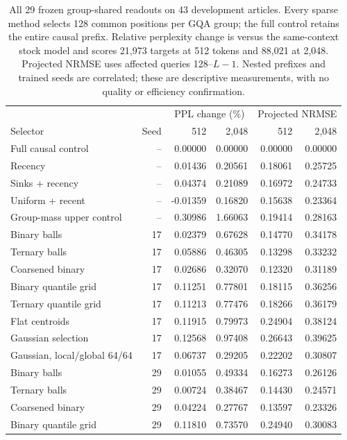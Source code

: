 \documentclass[11pt]{article}
\begin{document}
\begin{table}[tbp]
\centering\small
\setlength{\tabcolsep}{4pt}
\caption{All 29 frozen group-shared readouts on 43 development articles.
Every sparse method selects 128 common positions per GQA group; the full
control retains the entire causal prefix. Relative perplexity change is
versus the same-context stock model and scores 21,973 targets at 512 tokens
and 88,021 at 2,048. Projected NRMSE uses affected queries 128--\(L-1\).
Nested prefixes and trained seeds are correlated; these are descriptive
measurements, with no quality or efficiency confirmation.}
\begin{tabular}{lrrrrr}
\toprule
& & \multicolumn{2}{c}{PPL change (\%)} & \multicolumn{2}{c}{Projected NRMSE}\\
Selector & Seed & 512 & 2,048 & 512 & 2,048\\
\midrule
Full causal control & -- & 0.00000 & 0.00000 & 0.00000 & 0.00000\\
Recency & -- & 0.01436 & 0.20561 & 0.18061 & 0.25725\\
Sinks + recency & -- & 0.04374 & 0.21089 & 0.16972 & 0.24733\\
Uniform + recent & -- & -0.01359 & 0.16820 & 0.15638 & 0.23364\\
Group-mass upper control & -- & 0.30986 & 1.66063 & 0.19414 & 0.28163\\
\midrule
Binary balls & 17 & 0.02379 & 0.67628 & 0.14770 & 0.34178\\
Ternary balls & 17 & 0.05886 & 0.46305 & 0.13298 & 0.33232\\
Coarsened binary & 17 & 0.02686 & 0.32070 & 0.12320 & 0.31189\\
Binary quantile grid & 17 & 0.11251 & 0.77801 & 0.18115 & 0.36256\\
Ternary quantile grid & 17 & 0.11213 & 0.77476 & 0.18266 & 0.36179\\
Flat centroids & 17 & 0.11915 & 0.79973 & 0.24904 & 0.38124\\
Gaussian selection & 17 & 0.12568 & 0.97408 & 0.26643 & 0.39625\\
Gaussian, local/global 64/64 & 17 & 0.06737 & 0.29205 & 0.22202 & 0.30807\\
\midrule
Binary balls & 29 & 0.01055 & 0.49334 & 0.16273 & 0.26126\\
Ternary balls & 29 & 0.00724 & 0.38467 & 0.14430 & 0.24571\\
Coarsened binary & 29 & 0.04224 & 0.27767 & 0.13597 & 0.23326\\
Binary quantile grid & 29 & 0.11810 & 0.73570 & 0.24940 & 0.30083\\

\end{tabular}
\end{table}
\end{document}
